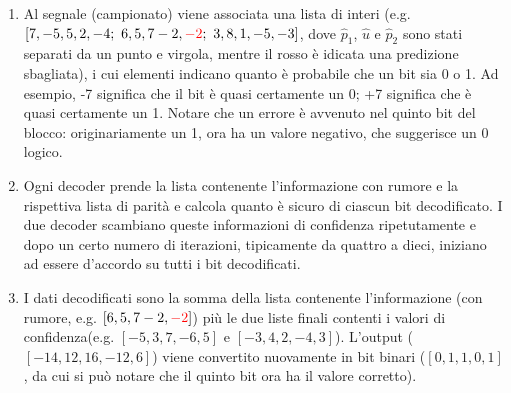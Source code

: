 \begin{center}
\end{center}



\begin{enumerate}
    \item Al segnale (campionato) viene associata una lista di interi (e.g. $[7, -5, 5, 2, -4; \ 6, 5, 7 -2, \textcolor{red}{-2}; \ 3, 8, 1, -5, -3]$, dove $\hat{p}_1$, $\hat{u}$ e $\hat{p}_2$ sono stati separati da un punto e virgola, mentre il rosso è idicata una predizione sbagliata), 
    i cui elementi indicano quanto è probabile che un bit sia 0 o 1. Ad esempio, -7 significa che il bit è quasi certamente un 0; +7 significa che è quasi certamente un 1. Notare che un errore è avvenuto nel quinto bit del blocco: originariamente un 1, ora ha un valore negativo, che suggerisce un 0 logico.
    \item Ogni decoder prende la lista contenente l'informazione con rumore e la rispettiva lista di parità e calcola quanto è sicuro di ciascun bit decodificato. I due decoder scambiano queste informazioni di confidenza ripetutamente e dopo un certo numero di iterazioni, tipicamente da quattro a dieci, iniziano ad essere d'accordo su tutti i bit decodificati. 
    \item I dati decodificati sono la somma della lista contenente l'informazione (con rumore, e.g. $[6, 5, 7 -2, \textcolor{red}{-2}]$) più le due liste finali contenti i valori di confidenza(e.g. $[-5, 3, 7, -6, 5]$ e $[-3, 4, 2, -4, 3]$). L'output ($[-14, 12, 16, -12, 6]$) viene convertito nuovamente in bit binari ($[0, 1, 1, 0, 1]$,  da cui si può notare che il quinto bit ora ha il valore corretto).
\end{enumerate}




